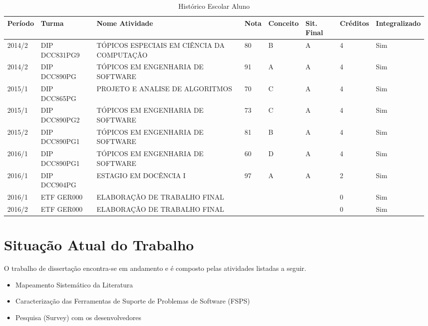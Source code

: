 \documentclass[10pt,a4paper]{report}
\begin{document}
\begin{table}[htb]
	\centering
	\begin{tabular}{llllllll}
		\hline
		Período & Turma         & Nome Atividade                           &
		Nota & Conceito & Sit. Final & Créditos & Integralizado \\ \hline
		2014/2  & DIP DCC831PG9 & TÓPICOS ESPECIAIS EM CIÊNCIA DA COMPUTAÇÃO & 80
		& B    & A         & 4        & Sim           \\
		2014/2  & DIP DCC890PG  & TÓPICOS EM ENGENHARIA DE SOFTWARE        & 91
		& A    & A         & 4        & Sim           \\
		2015/1  & DIP DCC865PG  & PROJETO E ANALISE DE ALGORITMOS          & 70
		& C    & A         & 4        & Sim           \\
		2015/1  & DIP DCC890PG2 & TÓPICOS EM ENGENHARIA DE SOFTWARE        & 73
		& C    & A         & 4        & Sim           \\
		2015/2  & DIP DCC890PG1 & TÓPICOS EM ENGENHARIA DE SOFTWARE        & 81
		& B    & A         & 4        & Sim           \\
		2016/1  & DIP DCC890PG1 & TÓPICOS EM ENGENHARIA DE SOFTWARE        & 60
		& D    & A         & 4        & Sim           \\
		2016/1  & DIP DCC904PG  & ESTAGIO EM DOCÊNCIA I                    & 97
		& A    & A         & 2        & Sim           \\
		2016/1  & ETF GER000    & ELABORAÇÃO DE TRABALHO FINAL             &
		&      &           & 0        & Sim           \\
		2016/2  & ETF GER000    & ELABORAÇÃO DE TRABALHO FINAL             &
		&      &           & 0        & Sim           \\ \hline
	\end{tabular}
	\caption{Histórico Escolar Aluno}\label{tab:historico}
\end{table}

\chapter{Situação Atual do Trabalho}
\label{situacao-atual}

O trabalho de dissertação encontra-se em andamento e é composto pelas atividades
listadas a seguir.

\begin{itemize}
	\item Mapeamento Sistemático da Literatura~\cite{keele2007guidelines}
	\item Caracterização das Ferramentas de Suporte de Problemas de Software
		(FSPS)
	\item Pesquisa (Survey) com os
		desenvolvedores~\cite{wohlin2012experimentation}
\end{itemize}
\end{document}
